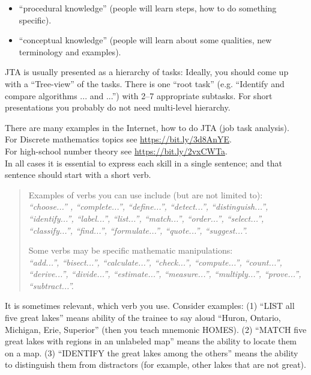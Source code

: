 \documentclass[jou]{apa6}
\begin{document}
\begin{itemize}
\item ``procedural knowledge'' (people will learn steps, how to do something specific).
\item ``conceptual knowledge'' (people will learn about some qualities, new terminology and examples). 
\end{itemize}

JTA is usually presented as a hierarchy of tasks:
Ideally, you should come up with a “Tree-view” of the tasks. There is one ``root task''
(e.g. ``Identify and compare algorithms ... and ...'') with 2--7 appropriate subtasks. 
For short presentations you probably do not need multi-level hierarchy.

There are many examples in the Internet, how to do JTA (job task analysis).\\
For Discrete mathematics topics see \url{https://bit.ly/3d8AnYE}.\\
For high-school number theory see \url{https://bit.ly/2vxCWTa}.\\
In all cases it is essential to express each skill in a single sentence; and that sentence should start with a short verb. 

\begin{quote}
Examples of verbs you can use include (but are not limited to):\\
{\em “choose...” , “complete...”, “define...”, “detect...”, “distinguish...”, 
“identify...”, “label...”, “list...”, “match...”, “order...”, “select...”,  
“classify...”, “find...”, “formulate...”, “quote...”, “suggest...”.}

Some verbs may be specific mathematic manipulations:\\
{\em “add...”, “bisect...”, “calculate...”, “check...”, “compute...”, “count...”, “derive...”, “divide...”, “estimate...”, “measure...”, “multiply...”, “prove...”, “subtract...”.}
\end{quote}

It is sometimes relevant, which verb you use. Consider examples:
(1) “LIST all five great lakes” means ability of the trainee to say aloud “Huron, Ontario, Michigan, Erie, Superior” (then you teach mnemonic HOMES). 
(2) “MATCH five great lakes with regions in an unlabeled map” means the ability to locate them on a map. 
(3) “IDENTIFY the great lakes among the others” means the ability to distinguish them from distractors (for example, other lakes that are not great).
\end{document}
